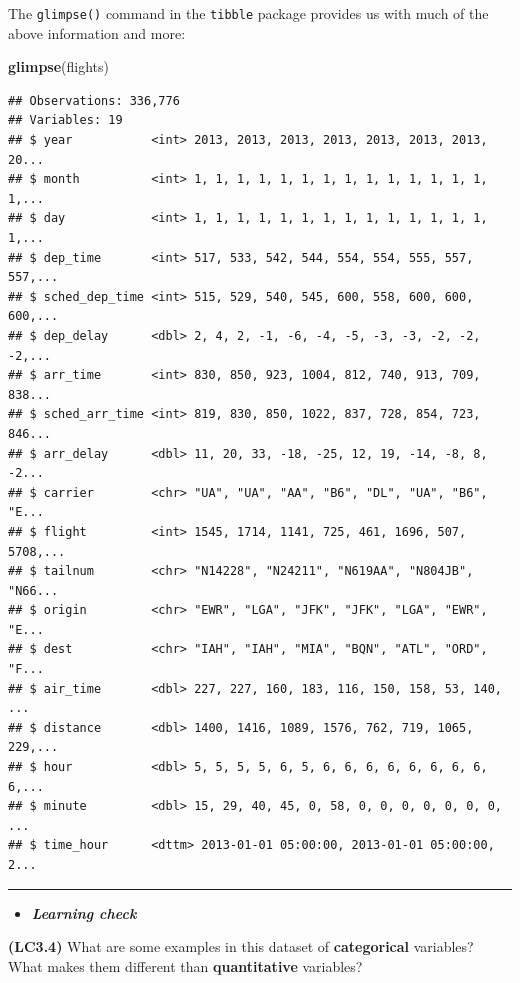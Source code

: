 \documentclass[]{tufte-book}
\newenvironment{Shaded}{\begin{snugshade}}{\end{snugshade}}
\newcommand{\KeywordTok}[1]{\textcolor[rgb]{0.13,0.29,0.53}{\textbf{{#1}}}}
\newcommand{\NormalTok}[1]{{#1}}
\let\oldrule=\rule
\renewcommand{\rule}[1]{\oldrule{\linewidth}}
\newenvironment{rmdblock}[1]
  {\begin{shaded*}
  \begin{itemize}
  \renewcommand{\labelitemi}{
    \raisebox{-.7\height}[0pt][0pt]{
    }
  }
  \item
  }
  {
  \end{itemize}
  \end{shaded*}
  }
\newenvironment{learncheck}
  {\begin{rmdblock}{warning}}
  {\end{rmdblock}}
\begin{document}
The \texttt{glimpse()} command in the \texttt{tibble} package provides
us with much of the above information and more:

\begin{Shaded}
\begin{Highlighting}[]
\KeywordTok{glimpse}\NormalTok{(flights)}
\end{Highlighting}
\end{Shaded}

\begin{verbatim}
## Observations: 336,776
## Variables: 19
## $ year           <int> 2013, 2013, 2013, 2013, 2013, 2013, 2013, 20...
## $ month          <int> 1, 1, 1, 1, 1, 1, 1, 1, 1, 1, 1, 1, 1, 1, 1,...
## $ day            <int> 1, 1, 1, 1, 1, 1, 1, 1, 1, 1, 1, 1, 1, 1, 1,...
## $ dep_time       <int> 517, 533, 542, 544, 554, 554, 555, 557, 557,...
## $ sched_dep_time <int> 515, 529, 540, 545, 600, 558, 600, 600, 600,...
## $ dep_delay      <dbl> 2, 4, 2, -1, -6, -4, -5, -3, -3, -2, -2, -2,...
## $ arr_time       <int> 830, 850, 923, 1004, 812, 740, 913, 709, 838...
## $ sched_arr_time <int> 819, 830, 850, 1022, 837, 728, 854, 723, 846...
## $ arr_delay      <dbl> 11, 20, 33, -18, -25, 12, 19, -14, -8, 8, -2...
## $ carrier        <chr> "UA", "UA", "AA", "B6", "DL", "UA", "B6", "E...
## $ flight         <int> 1545, 1714, 1141, 725, 461, 1696, 507, 5708,...
## $ tailnum        <chr> "N14228", "N24211", "N619AA", "N804JB", "N66...
## $ origin         <chr> "EWR", "LGA", "JFK", "JFK", "LGA", "EWR", "E...
## $ dest           <chr> "IAH", "IAH", "MIA", "BQN", "ATL", "ORD", "F...
## $ air_time       <dbl> 227, 227, 160, 183, 116, 150, 158, 53, 140, ...
## $ distance       <dbl> 1400, 1416, 1089, 1576, 762, 719, 1065, 229,...
## $ hour           <dbl> 5, 5, 5, 5, 6, 5, 6, 6, 6, 6, 6, 6, 6, 6, 6,...
## $ minute         <dbl> 15, 29, 40, 45, 0, 58, 0, 0, 0, 0, 0, 0, 0, ...
## $ time_hour      <dttm> 2013-01-01 05:00:00, 2013-01-01 05:00:00, 2...
\end{verbatim}

\begin{center}\rule{0.5\linewidth}{\linethickness}\end{center}

\begin{learncheck}
\textbf{\emph{Learning check}}
\end{learncheck}

\textbf{(LC3.4)} What are some examples in this dataset of
\textbf{categorical} variables? What makes them different than
\textbf{quantitative} variables?
\end{document}
